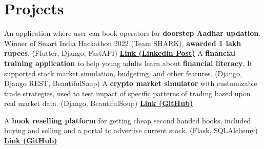 \section{Projects}
  \resumeSubHeadingListStart
      {An application where user can book operators for \textbf{doorstep Aadhar updation}. Winner of Smart India Hackathon 2022 (Team SHARK), \textbf{awarded 1 lakh rupees}. (Flutter, Django, FastAPI) \href{https://www.linkedin.com/posts/hsk4link_sih-sih2022-smartindiahackathon-activity-6970324738409672704-YcQA/}{\textbf{Link (Linkedin Post)}}}
      {A \textbf{financial training application} to help young adults learn about \textbf{financial literacy}, It supported stock market simulation, budgeting, and other features. (Django, Django REST, BeautifulSoup)}
      {A \textbf{crypto market simulator} with customizable trade strategies, used to test impact of specific patterns of trading based upon real market data. (Django, BeautifulSoup) \href{https://github.com/hari01584/WazirX-Trade-assist-bot-and-Simulator-}{\textbf{Link (GitHub)}}}
      
      {A \textbf{book reselling platform} for getting cheap second handed books, included buying and selling and a portal to advertise current stock. (Flask, SQLAlchemy) \href{https://github.com/hari01584/Pustika-Eclipse-Hackathon}{\textbf{Link (GitHub)}}}



  \resumeSubHeadingListEnd
